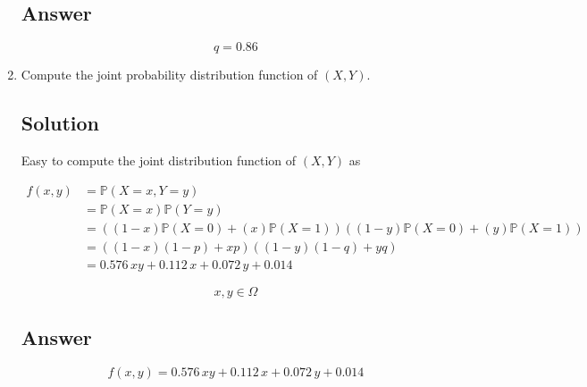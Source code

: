 \documentclass[12pt]{article}
\newcommand{\bP}{\mathbb{P}}
\begin{document}
\begin{enumerate}[start=1,label={\bfseries Part \arabic*:},leftmargin=0in]
		\subsection*{Answer}
		
			\[\boxed{q = 0.86}\]
			
		\bigskip\item Compute the joint probability distribution function of $(X,Y)$.
		
		\subsection*{Solution}
		
			Easy to compute the joint distribution function of $(X,Y)$ as
		
			\[
			\begin{aligned}
				f(x,y) &= \bP(X=x,Y=y)\\
				&= \bP(X=x)\bP(Y=y)\\
				&= ((1-x)\bP(X=0) + (x)\bP(X=1))((1-y)\bP(X=0) + (y)\bP(X=1))\\
				&= ((1-x)(1-p) + xp)((1-y)(1-q) + yq)\\
				&= 0.576\,xy + 0.112\,x + 0.072\,y + 0.014
			\end{aligned}
			\]
			
			\[x,y\in \Omega\]
		
		\subsection*{Answer}
		
			\[\boxed{f(x,y) = 0.576\,xy + 0.112\,x + 0.072\,y + 0.014}\]
	\end{enumerate}
	
\end{document}
